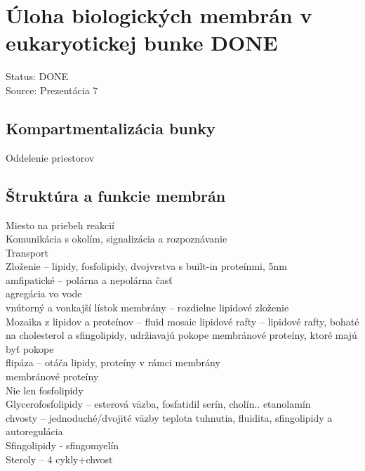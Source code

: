 \section{Úloha biologických membrán v eukaryotickej bunke DONE}

Status: DONE\\
Source: Prezentácia 7\\

\subsection{Kompartmentalizácia bunky}
Oddelenie priestorov\\
\subsection{Štruktúra a funkcie membrán}
Miesto na priebeh reakcií\\
Komunikácia s okolím, signalizácia a rozpoznávanie\\
Transport\\
Zloženie -- lipidy, fosfolipidy, dvojvrstva s built-in proteínmi, 5nm\\
amfipatické -- polárna a nepolárna časť\\
agregácia vo vode\\
vnútorný a vonkajší lístok membrány -- rozdielne lipidové zloženie\\
Mozaika z lipidov a proteínov -- fluid mosaic
lipidové rafty -- lipidové rafty, bohaté na cholesterol a sfingolipidy, udržiavajú pokope membránové proteíny, ktoré majú byť pokope\\
flipáza -- otáča lipidy, proteíny v rámci membrány\\
membránové proteíny\\

Nie len fosfolipidy\\
\tab Glycerofosfolipidy -- esterová väzba, fosfatidil serín, cholín.. etanolamín\\
\tab chvosty -- jednoduché/dvojité väzby \ra teplota tuhnutia, fluidita, sfingolipidy a autoregulácia\\
\tab Sfingolipidy - sfingomyelín\\
\tab Steroly -- 4 cykly+chvost\\
